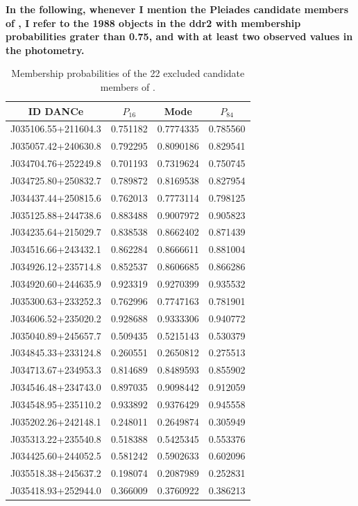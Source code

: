 \textbf{In the following, whenever I mention the Pleiades candidate members of \citet{Bouy2015}, I refer to the 1988 objects in the \gls{ddr2} with \citet{Bouy2015} membership probabilities grater than 0.75, and with at least two observed values in the photometry.}

\begin{table}[htdp]
\caption{Membership probabilities of the 22 excluded candidate members of \citet{Bouy2015}.}
\begin{center}
\begin{tabular}{|c|c|c|c|}
\hline
ID DANCe & $P_{16}$ & Mode & $P_{84}$\\
\hline
\hline
J035106.55+211604.3 &0.751182& 0.7774335&    0.785560\\
J035057.42+240630.8 &0.792295& 0.8090186&   0.829541 \\
J034704.76+252249.8& 0.701193& 0.7319624 &   0.750745\\
J034725.80+250832.7 &0.789872& 0.8169538 &  0.827954 \\
J034437.44+250815.6 &0.762013& 0.7773114 &   0.798125\\
J035125.88+244738.6& 0.883488& 0.9007972 &  0.905823 \\
J034235.64+215029.7 &0.838538& 0.8662402 &  0.871439 \\
J034516.66+243432.1 &0.862284& 0.8666611 &   0.881004\\
J034926.12+235714.8& 0.852537& 0.8606685 &  0.866286 \\
J034920.60+244635.9 &0.923319& 0.9270399 &  0.935532 \\
J035300.63+233252.3 &0.762996& 0.7747163 &  0.781901 \\
J034606.52+235020.2& 0.928688& 0.9333306 &  0.940772 \\
J035040.89+245657.7 &0.509435& 0.5215143 &  0.530379 \\
J034845.33+233124.8 &0.260551& 0.2650812 &  0.275513 \\
J034713.67+234953.3& 0.814689& 0.8489593 &  0.855902 \\
J034546.48+234743.0 &0.897035& 0.9098442 &  0.912059 \\
J034548.95+235110.2 &0.933892& 0.9376429 &   0.945558\\
J035202.26+242148.1& 0.248011& 0.2649874 &   0.305949\\
J035313.22+235540.8 &0.518388& 0.5425345 &  0.553376 \\
J034425.60+244052.5 &0.581242& 0.5902633 &  0.602096 \\
J035518.38+245637.2& 0.198074& 0.2087989 &  0.252831 \\
J035418.93+252944.0& 0.366009& 0.3760922 &  0.386213 \\
\hline
\end{tabular}
\end{center}
\label{tab:22excluded}
\end{table}%


